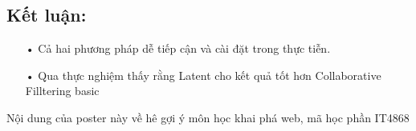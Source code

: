 \documentclass[a0,portrait,11pt]{a0poster}
\begin{document}
\begin{mybox}
\begin{multicols}{3}
\subsection*{Kết luận:}
\begin{itemize}
\item[•] Cả hai phương pháp dễ tiếp cận và cài đặt trong thực tiễn.
\item[•] Qua thực nghiệm thấy rằng Latent cho kết quả tốt hơn Collaborative Filltering basic
\end{itemize}
\end{multicols}
\end{mybox}
\begin{center}
\begin{minipage}[c]{0.6\linewidth}
\begin{mdframed}[backgroundcolor=gray!20]
\begin{center}
   Nội dung của poster này về hê gợi ý môn học khai phá web, mã học phần IT4868
\end{center}
\end{mdframed}
\end{minipage}
\end{center}
\end{document}
